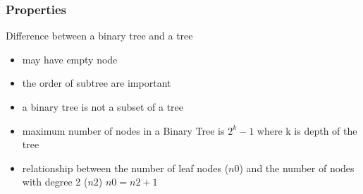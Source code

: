 \documentclass[newPxFont,sthlmFooter,nooffset]{beamer}
\begin{document}
\begin{frame}[t]
  \frametitle{Properties}
Difference between a binary tree and a tree
\begin{itemize}
\item may have empty node
\item the order of subtree are important
\item a  binary tree is not a subset of a tree
\item maximum number of nodes in a Binary Tree is $2^k -1$ where k is
  depth of the tree
\item relationship between the number of leaf nodes ($n0$) and the
  number of nodes with degree 2 ($n2$) $ n0 =n2 +1$
\end{itemize}

\end{frame}
\end{document}
